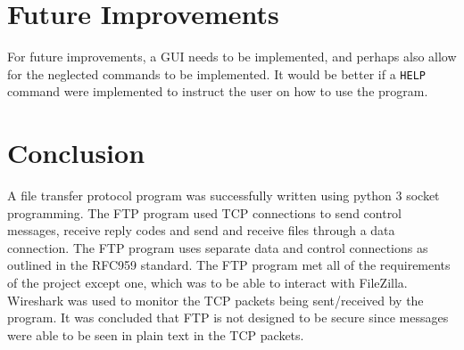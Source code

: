 \documentclass[journal, a4paper]{IEEEtran}
\begin{document}
\section{Future Improvements}

For future improvements, a GUI needs to be implemented, and perhaps also allow for the neglected commands to be implemented. It would be better if a \texttt{HELP} command were implemented to instruct the user on how to use the program.

\section{Conclusion}
A file transfer protocol program was successfully written using python 3 socket programming. The FTP program used TCP connections to send control messages, receive reply codes and send and receive files through a data connection. The FTP program uses separate data and control connections as outlined in the RFC959 standard. The FTP program met all of the requirements of the project except one, which was to be able to interact with FileZilla. Wireshark was used to monitor the TCP packets being sent/received by the program. It was concluded that FTP is not designed to be secure since messages were able to be seen in plain text in the TCP packets.
%
\onecolumn


\newpage
\appendix
\end{document}
